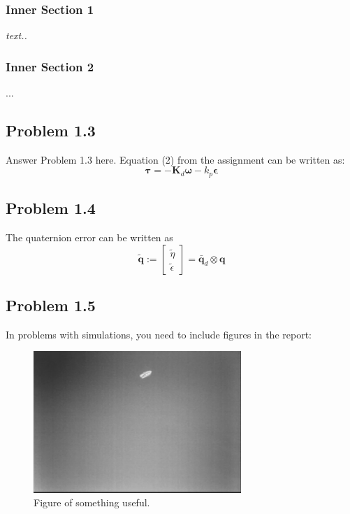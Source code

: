 \subsubsection*{Inner Section 1}
\emph{text..}

\subsubsection*{Inner Section 2}
...

\subsection*{Problem 1.3}
Answer Problem 1.3 here. Equation (2) from the assignment can be written as: 
\begin{equation}
  \label{eq:tau}
  \mathbf{\tau} = -\mathbf{K}_d \boldsymbol{\omega} - k_p \boldsymbol{\epsilon}
\end{equation}

\subsection*{Problem 1.4}
The quaternion error can be written as
 \begin{equation}
	 \tilde{\mathbf{q}} := \left[
	 \begin{array}{c}
		 \tilde{\eta} \\
		 \tilde{\epsilon}
	 \end{array}
	 \right] = \bar{\mathbf{q}}_d \otimes \mathbf{q} 
 \end{equation}

\subsection*{Problem 1.5}
In problems with simulations, you need to include figures in the report:
\begin{figure}[ht]
	\centering
	\includegraphics[width=0.7\textwidth]{fig1} %
	\caption{Figure of something useful.}
	\label{fig:fig1}
\end{figure}

